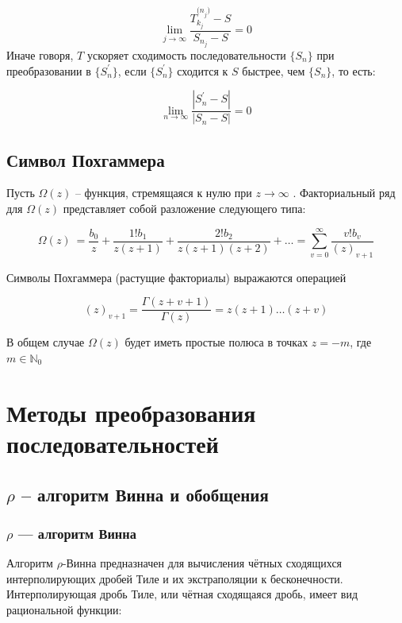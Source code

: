 \documentclass[14pt, a4paper]{extarticle}
\theoremstyle{definition}
\theoremstyle{remark}
\begin{document}
\[\lim_{j \rightarrow \infty}\frac{T_{k_{j}}^{{(n}_{j})} - S}{S_{n_{j}} - S} = 0\]
Иначе говоря, \(T\) ускоряет сходимость последовательности
\(\{ S_{n}\}\) при преобразовании в \(\{ S_{n}^{'}\}\), если
\(\{ S_{n}^{'}\}\) сходится к \(S\) быстрее, чем \(\{ S_{n}\}\), то
есть:

\[\lim_{n \rightarrow \infty}\frac{\left| S_{n}^{'} - S \right|}{\left| S_{n} - S \right|} = 0\]

\subsection*{Символ Похгаммера}
Пусть \(\Omega(z)\) -- функция, стремящаяся к нулю при \(z \to\infty \) . Факториальный ряд для \(\Omega(z)\) представляет собой разложение
следующего типа:

\[\Omega(z)\  = \frac{b_{0}}{z} + \frac{1!b_{1}}{z(z + 1)} + \frac{2!b_{2}}{z(z + 1)(z + 2)} + \ldots = \sum_{v = 0}^{\infty}\frac{v!b_{v}}{{(z)}_{v + 1}}\]

Символы Похгаммера (растущие факториалы) выражаются операцией

\[{(z)}_{v + 1} = \frac{\Gamma(z + v + 1)}{\Gamma(z)} = z(z + 1)\ldots(z + v)\]

В общем случае \(\Omega(z)\) будет иметь простые полюса в точках \(z =
-m\), где \(m \in \mathbb{N}_{0}\)



\section{Методы преобразования
последовательностей}


\subsection{\(\rho\) -- алгоритм Винна и обобщения}

\subsubsection*{\(\rho\) — алгоритм Винна}

Алгоритм \(\rho\)-Винна предназначен для вычисления чётных сходящихся
интерполирующих дробей Тиле и их экстраполяции к бесконечности. Интерполирующая дробь Тиле, или чётная сходящаяся дробь, имеет вид
рациональной функции:
\end{document}

